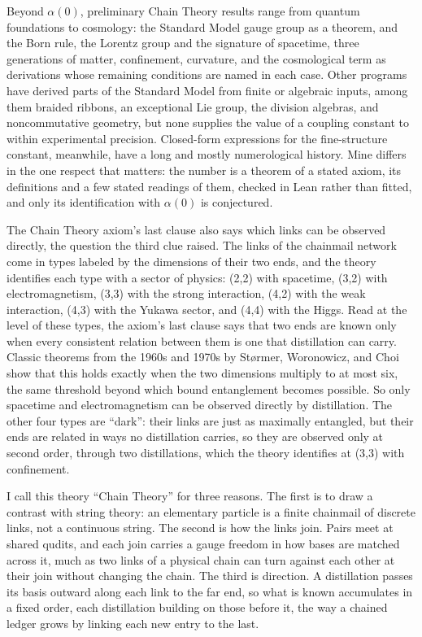 Beyond $\alpha(0)$, preliminary Chain Theory results range from quantum foundations to cosmology: the Standard Model gauge group as a theorem, and the Born rule, the Lorentz group and the signature of spacetime, three generations of matter, confinement, curvature, and the cosmological term as derivations whose remaining conditions are named in each case. Other programs have derived parts of the Standard Model from finite or algebraic inputs, among them braided ribbons, an exceptional Lie group, the division algebras, and noncommutative geometry, but none supplies the value of a coupling constant to within experimental precision. Closed-form expressions for the fine-structure constant, meanwhile, have a long and mostly numerological history. Mine differs in the one respect that matters: the number is a theorem of a stated axiom, its definitions and a few stated readings of them, checked in Lean rather than fitted, and only its identification with $\alpha(0)$ is conjectured.

The Chain Theory axiom's last clause also says which links can be observed directly, the question the third clue raised. The links of the chainmail network come in types labeled by the dimensions of their two ends, and the theory identifies each type with a sector of physics: (2,2) with spacetime, (3,2) with electromagnetism, (3,3) with the strong interaction, (4,2) with the weak interaction, (4,3) with the Yukawa sector, and (4,4) with the Higgs. Read at the level of these types, the axiom's last clause says that two ends are known only when every consistent relation between them is one that distillation can carry. Classic theorems from the 1960s and 1970s by St{\o}rmer, Woronowicz, and Choi show that this holds exactly when the two dimensions multiply to at most six, the same threshold beyond which bound entanglement becomes possible. So only spacetime and electromagnetism can be observed directly by distillation. The other four types are ``dark'': their links are just as maximally entangled, but their ends are related in ways no distillation carries, so they are observed only at second order, through two distillations, which the theory identifies at (3,3) with confinement.

I call this theory ``Chain Theory'' for three reasons. The first is to draw a contrast with string theory: an elementary particle is a finite chainmail of discrete links, not a continuous string. The second is how the links join. Pairs meet at shared qudits, and each join carries a gauge freedom in how bases are matched across it, much as two links of a physical chain can turn against each other at their join without changing the chain. The third is direction. A distillation passes its basis outward along each link to the far end, so what is known accumulates in a fixed order, each distillation building on those before it, the way a chained ledger grows by linking each new entry to the last.

